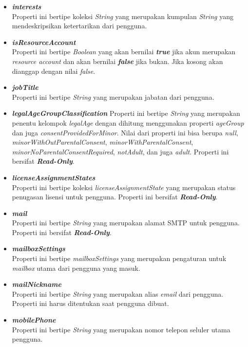 \begin{itemize}
	\item \textbf{\textit{interests}}\\
	Properti ini bertipe koleksi \textit{String} yang merupakan kumpulan \textit{String} yang mendeskripsikan ketertarikan dari pengguna.
	\item \textbf{\textit{isResourceAccount}}\\
	Properti ini bertipe \textit{Boolean} yang akan bernilai \textbf{\textit{true}} jika akun merupakan \textit{resource account} dan akan bernilai \textbf{\textit{false}} jika bukan. Jika kosong akan dianggap dengan nilai \textit{false}.
	\item \textbf{\textit{jobTitle}}\\
	Properti ini bertipe \textit{String} yang merupakan jabatan dari pengguna.
	\item \textbf{\textit{legalAgeGroupClassification}}
	Properti ini bertipe \textit{String} yang merupakan penentu kelompok \textit{legalAge} dengan dihitung menggunakan properti \textit{ageGroup} dan juga \textit{consentProvidedForMinor}. Nilai dari properti ini bisa berupa \textit{null}, \textit{minorWithOutParentalConsent}, \textit{minorWithParentalConsent}, \textit{minorNoParentalConsentRequired}, \textit{notAdult}, dan juga \textit{adult}. Properti ini bersifat \textbf{\textit{Read-Only}}.
	 \item \textbf{\textit{licenseAssignmentStates}}\\
	Properti ini bertipe koleksi \textit{licenseAssignmentState} yang merupakan status penugasan lisensi untuk pengguna. Properti ini bersifat \textbf{\textit{Read-Only}}.
	\item \textbf{\textit{mail}}\\
	Properti ini bertipe \textit{String} yang merupakan alamat SMTP untuk pengguna. Properti ini bersifat \textbf{\textit{Read-Only}}.
	\item \textbf{\textit{mailboxSettings}}\\
	Properti ini bertipe \textit{mailboxSettings} yang merupakan pengaturan untuk \textit{mailbox} utama dari pengguna yang masuk.
	\item \textbf{\textit{mailNickname}}\\
	Properti ini bertipe \textit{String} yang merupakan alias \textit{email} dari pengguna. Properti ini harus ditentukan saat pengguna dibuat. 
	\item \textbf{\textit{mobilePhone}}\\
	Properti ini bertipe \textit{String} yang merupakan nomor telepon seluler utama pengguna.

\end{itemize}
